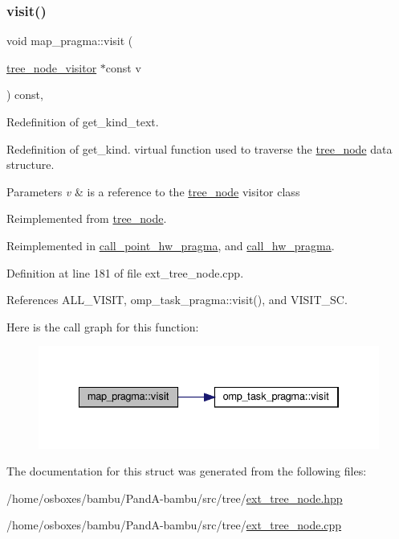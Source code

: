 \subsubsection{\texorpdfstring{visit()}{visit()}}
{\footnotesize\ttfamily void map\+\_\+pragma\+::visit (\begin{DoxyParamCaption}\item[{\hyperlink{classtree__node__visitor}{tree\+\_\+node\+\_\+visitor} $\ast$const}]{v }\end{DoxyParamCaption}) const\hspace{0.3cm}{\ttfamily [override]}, {\ttfamily [virtual]}}



Redefinition of get\+\_\+kind\+\_\+text. 

Redefinition of get\+\_\+kind. virtual function used to traverse the \hyperlink{classtree__node}{tree\+\_\+node} data structure. 
\begin{DoxyParams}{Parameters}
{\em v} & is a reference to the \hyperlink{classtree__node}{tree\+\_\+node} visitor class \\
\hline
\end{DoxyParams}


Reimplemented from \hyperlink{classtree__node_aa9abba3f1b30e0be80b4a56b188c6ecc}{tree\+\_\+node}.



Reimplemented in \hyperlink{structcall__point__hw__pragma_a3c039efe1da66ca0ab6445535aaa6eb2}{call\+\_\+point\+\_\+hw\+\_\+pragma}, and \hyperlink{structcall__hw__pragma_a7ad2f9a214388ac8de0806ff6c8db2bc}{call\+\_\+hw\+\_\+pragma}.



Definition at line 181 of file ext\+\_\+tree\+\_\+node.\+cpp.



References A\+L\+L\+\_\+\+V\+I\+S\+IT, omp\+\_\+task\+\_\+pragma\+::visit(), and V\+I\+S\+I\+T\+\_\+\+SC.

Here is the call graph for this function\+:
\nopagebreak
\begin{figure}[H]
\begin{center}
\leavevmode
\includegraphics[width=334pt]{de/d12/structmap__pragma_a418af88fad63d1e91a1d1b12bc19b70c_cgraph}
\end{center}
\end{figure}


The documentation for this struct was generated from the following files\+:\begin{DoxyCompactItemize}
\item 
/home/osboxes/bambu/\+Pand\+A-\/bambu/src/tree/\hyperlink{ext__tree__node_8hpp}{ext\+\_\+tree\+\_\+node.\+hpp}\item 
/home/osboxes/bambu/\+Pand\+A-\/bambu/src/tree/\hyperlink{ext__tree__node_8cpp}{ext\+\_\+tree\+\_\+node.\+cpp}\end{DoxyCompactItemize}
